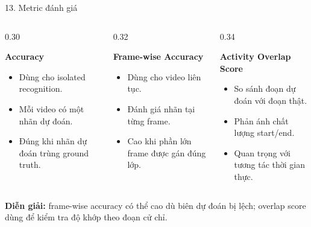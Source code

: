 \documentclass[aspectratio=169,9pt]{beamer}
\newcommand{\smallnote}[1]{{\fontsize{7.1}{8.5}\selectfont #1\par}}
\newcommand{\heading}[1]{{\bfseries #1\par}}
\newcommand{\tightitems}{\setlength{\itemsep}{0.12em}\setlength{\parskip}{0pt}\setlength{\parsep}{0pt}}
\begin{document}
\begin{frame}{13. Metric đánh giá}
  \vspace{0.02cm}
  \begin{columns}[T,onlytextwidth]
    \begin{column}{0.30\textwidth}
      \heading{Accuracy}
      \begin{itemize}\tightitems
        \item Dùng cho isolated recognition.
        \item Mỗi video có một nhãn dự đoán.
        \item Đúng khi nhãn dự đoán trùng ground truth.
      \end{itemize}
    \end{column}
    \begin{column}{0.32\textwidth}
      \heading{Frame-wise Accuracy}
      \begin{itemize}\tightitems
        \item Dùng cho video liên tục.
        \item Đánh giá nhãn tại từng frame.
        \item Cao khi phần lớn frame được gán đúng lớp.
      \end{itemize}
    \end{column}
    \begin{column}{0.34\textwidth}
      \heading{Activity Overlap Score}
      \begin{itemize}\tightitems
        \item So sánh đoạn dự đoán với đoạn thật.
        \item Phản ánh chất lượng start/end.
        \item Quan trọng với tương tác thời gian thực.
      \end{itemize}
    \end{column}
  \end{columns}
  \vspace{0.17cm}
  \centering
  \vspace{0.12cm}
  \smallnote{\textbf{Diễn giải:} frame-wise accuracy có thể cao dù biên dự đoán bị lệch; overlap score dùng để kiểm tra độ khớp theo đoạn cử chỉ.}
\end{frame}
\end{document}
